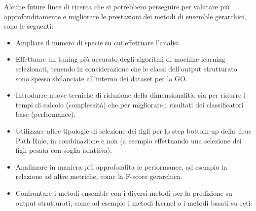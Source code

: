 \documentclass[12pt]{report}
\begin{document}
Alcune future linee di ricerca che si potrebbero perseguire per valutare più approfonditamente e migliorare le prestazioni dei metodi di ensemble gerarchici, sono le seguenti:

\begin{itemize}
\item Ampliare il numero di specie su cui effettuare l'analisi.
\item Effettuare un tuning più accurato degli algoritmi di machine learning selezionati, tenendo in considerazione che le classi dell'output strutturato sono spesso sbilanciate all'interno dei dataset per la GO.
\item Introdurre nuove tecniche di riduzione della dimensionalità, sia per ridurre i tempi di calcolo (complessità) che per migliorare i risultati dei classificatori base (performance).
\item Utilizzare altre tipologie di selezione dei figli per lo step bottom-up della True Path Rule, in combinazione e non (a esempio effettuando una selezione dei figli pesata con soglia adattiva).
\item Analizzare in maniera più approfondita le performance, ad esempio in relazione ad altre metriche, come la F-score gerarchica.
\item Confrontare i metodi ensemble con i diversi metodi per la predizione su output strutturati, come ad esempio i metodi Kernel o i metodi basati su reti.
\end{itemize} 
\end{document}
